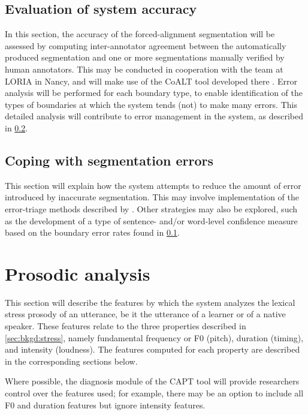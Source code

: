 	\subsection{Evaluation of system accuracy}
	\label{sec:segmentation:eval}
	
	In this section, the accuracy of the forced-alignment segmentation will be assessed by computing inter-annotator agreement between the automatically produced segmentation and one or more segmentations manually verified by human annotators. This may be conducted in cooperation with the team at LORIA in Nancy, and will make use of the CoALT tool developed there \citep{Fohr2012}. Error analysis will be performed for each boundary type, to enable identification of the types of boundaries at which the system tends (not) to make many errors. This detailed analysis will contribute to error management in the system, as described in \cref{sec:segmentation:errors}.
	
	\subsection{Coping with segmentation errors}
	\label{sec:segmentation:errors}
	
	This section will explain how the system attempts to reduce the amount of error introduced by inaccurate segmentation. This may involve implementation of the error-triage methods described by \textcite{Mesbahi2011,Bonneau2012,Orosanu2012}. Other strategies may also be explored, such as the development of a type of sentence- and/or word-level confidence measure based on the boundary error rates found in \cref{sec:segmentation:eval}.
	
\section{Prosodic analysis}
\label{sec:diag:prosody}

	This section will describe the features by which the system analyzes the lexical stress prosody of an utterance, be it the utterance of a learner or of a native speaker. These features relate to the three properties described in \cref{sec:bkgd:stress}, namely fundamental frequency or F0 (pitch), duration (timing), and intensity (loudness). The features computed for each property are described in the corresponding sections below.
	
	Where possible, the diagnosis module of the CAPT tool will provide researchers control over the features used; for example, there may be an option to include all F0 and duration features but ignore intensity features.
	
